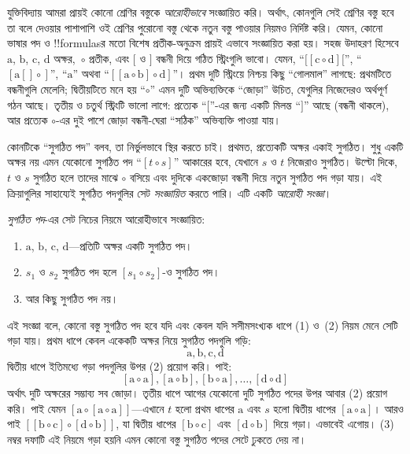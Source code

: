 \documentclass[../../../include/open-logic-section]{subfiles}
\begin{document}


যুক্তিবিদ্যায় আমরা প্রায়ই কোনো শ্রেণির বস্তুকে \emph{আরোহীভাবে}
সংজ্ঞায়িত করি। অর্থাৎ, কোনগুলি সেই শ্রেণির বস্তু হবে তা
বলে দেওয়ার পাশাপাশি ওই শ্রেণির পুরোনো বস্তু থেকে নতুন
বস্তু পাওয়ার নিয়মও নির্দিষ্ট করি। যেমন, কোনো ভাষার পদ ও
!!{formula}sর মতো বিশেষ প্রতীক-অনুক্রম প্রায়ই এভাবে
সংজ্ঞায়িত করা হয়। সহজ উদাহরণ হিসেবে $\mathrm{a}$,
$\mathrm{b}$, $\mathrm{c}$, $\mathrm{d}$ অক্ষর,~$\circ$ প্রতীক,
এবং $[$ ও $]$ বন্ধনী দিয়ে গঠিত স্ট্রিংগুলি ভাবো। যেমন,
``$[[\mathrm{c} \circ \mathrm{d}][$'', ``$[\mathrm{a}[]\circ]$'',
``$\mathrm{a}$'' অথবা ``$[[\mathrm{a} \circ \mathrm{b}]\circ
\mathrm{d}]$''। প্রথম দুটি স্ট্রিংয়ে নিশ্চয় কিছু ``গোলমাল''
লাগছে: প্রথমটিতে বন্ধনীগুলি মেলেনি; দ্বিতীয়টিতে মনে হয়
``$\circ$'' এমন দুটি অভিব্যক্তিকে ``জোড়া'' উচিত, যেগুলির
নিজেদেরও অর্থপূর্ণ গঠন আছে। তৃতীয় ও চতুর্থ স্ট্রিংটি ভালো
লাগে: প্রত্যেক ``$[$''-এর জন্য একটি মিলন্ত ``$]$'' আছে
(বন্ধনী থাকলে), আর প্রত্যেক $\circ$-এর দুই পাশে জোড়া
বন্ধনী-ঘেরা ``সঠিক'' অভিব্যক্তি পাওয়া যায়।

কোনটিকে ``সুগঠিত পদ'' বলব, তা নির্ভুলভাবে স্থির করতে চাই।
প্রথমত, প্রত্যেকটি অক্ষর একাই সুগঠিত। শুধু একটি অক্ষর নয়
এমন যেকোনো সুগঠিত পদ ``$[t \circ s]$'' আকারের হবে,
যেখানে $s$ ও $t$ নিজেরাও সুগঠিত। উল্টো দিকে, $t$ ও $s$
সুগঠিত হলে তাদের মাঝে $\circ$ বসিয়ে এবং দুদিকে একজোড়া
বন্ধনী দিয়ে নতুন সুগঠিত পদ গড়া যায়। এই ক্রিয়াগুলির
সাহায্যেই সুগঠিত পদগুলির সেট \emph{সংজ্ঞায়িত} করতে পারি।
এটি একটি \emph{আরোহী সংজ্ঞা}।

\begin{defn}[সুগঠিত পদ]
  \emph{সুগঠিত পদ}-এর সেট নিচের নিয়মে আরোহীভাবে সংজ্ঞায়িত:
  \begin{enumerate}
  \item $\mathrm{a}$, $\mathrm{b}$, $\mathrm{c}$,
    $\mathrm{d}$—প্রতিটি অক্ষর একটি সুগঠিত পদ।
  \item $s_1$ ও $s_2$ সুগঠিত পদ হলে
    $[s_1 \circ s_2]$-ও সুগঠিত পদ।
  \item আর কিছু সুগঠিত পদ নয়।
  \end{enumerate}
\end{defn}

এই সংজ্ঞা বলে, কোনো বস্তু সুগঠিত পদ হবে যদি এবং কেবল
যদি সসীমসংখ্যক ধাপে (1) ও~(2) নিয়ম মেনে সেটি গড়া যায়।
প্রথম ধাপে কেবল একেকটি অক্ষর নিয়ে সুগঠিত পদগুলি গড়ি:
\[
\mathrm{a}, \mathrm{b}, \mathrm{c}, \mathrm{d}
\]
দ্বিতীয় ধাপে ইতিমধ্যে গড়া পদগুলির উপর (2) প্রয়োগ করি। পাই:
\[
[\mathrm{a} \circ \mathrm{a}], [\mathrm{a} \circ \mathrm{b}],
[\mathrm{b} \circ \mathrm{a}], \dots, [\mathrm{d} \circ \mathrm{d}]
\]
অর্থাৎ দুটি অক্ষরের সম্ভাব্য সব জোড়া। তৃতীয় ধাপে আগের
যেকোনো দুটি সুগঠিত পদের উপর আবার (2) প্রয়োগ করি।
পাই যেমন $[\mathrm{a} \circ [\mathrm{a} \circ
    \mathrm{a}]]$—এখানে $t$ হলো প্রথম ধাপের $\mathrm{a}$
এবং $s$ হলো দ্বিতীয় ধাপের $[\mathrm{a} \circ \mathrm{a}]$।
আরও পাই $[[\mathrm{b} \circ
    \mathrm{c}] \circ [\mathrm{d} \circ \mathrm{b}]]$,
যা দ্বিতীয় ধাপের $[\mathrm{b} \circ \mathrm{c}]$ এবং $[\mathrm{d}
  \circ \mathrm{b}]$ দিয়ে গড়া। এভাবেই এগোয়। (3) নম্বর
দফাটি এই নিয়মে গড়া হয়নি এমন কোনো বস্তু সুগঠিত পদের
সেটে ঢুকতে দেয় না।
\end{document}
